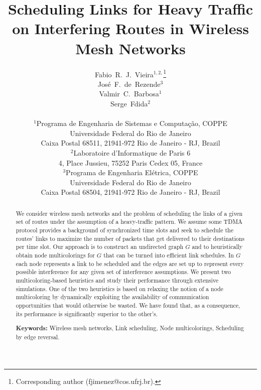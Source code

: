 \documentclass{article}
\begin{document}
\title{Scheduling Links for Heavy Traffic on Interfering Routes in Wireless Mesh
Networks}

\author{Fabio~R.~J.~Vieira$^{1,2,}$\thanks{Corresponding author (fjimenez@cos.ufrj.br).}\\
Jos\'e~F.~de~Rezende$^3$\\
Valmir~C.~Barbosa$^1$\\
Serge~Fdida$^2$\\
\\
$^1$Programa de Engenharia de Sistemas e Computa\c c\~ao, COPPE\\
Universidade Federal do Rio de Janeiro\\
Caixa Postal 68511, 21941-972 Rio de Janeiro - RJ, Brazil\\
$^2$Laboratoire d'Informatique de Paris 6\\
4, Place Jussieu, 75252 Paris Cedex 05, France\\
$^3$Programa de Engenharia El\'etrica, COPPE\\
Universidade Federal do Rio de Janeiro\\
Caixa Postal 68504, 21941-972 Rio de Janeiro - RJ, Brazil}

\date{}

\maketitle

\begin{abstract}
We consider wireless mesh networks and the problem of scheduling the links of a
given set of routes under the assumption of a heavy-traffic pattern. We assume
some TDMA protocol provides a background of synchronized time slots and seek to
schedule the routes' links to maximize the number of packets that get delivered
to their destinations per time slot. Our approach is to construct an undirected
graph $G$ and to heuristically obtain node multicolorings for $G$ that can be
turned into efficient link schedules. In $G$ each node represents a link to be
scheduled and the edges are set up to represent every possible interference for
any given set of interference assumptions. We present two multicoloring-based
heuristics and study their performance through extensive simulations. One of the
two heuristics is based on relaxing the notion of a node multicoloring by
dynamically exploiting the availability of communication opportunities that
would otherwise be wasted. We have found that, as a consequence, its performance
is significantly superior to the other's.

\bigskip
\noindent
\textbf{Keywords:} Wireless mesh networks, Link scheduling, Node multicolorings,
Scheduling by edge reversal.
\end{abstract}
\end{document}
